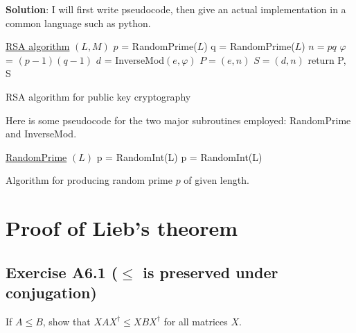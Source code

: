 \documentclass{book}
\begin{document}
    \textbf{Solution}: I will first write pseudocode, then give an actual implementation in a common language such as python.
    \begin{algorithm}
        
        \underline{RSA algorithm} $(L,M)$\;
        $p$ = RandomPrime($L$)\;
        q = RandomPrime($L$)\;
        $n = pq$\;
        $\varphi$ = $(p-1)(q-1)$\;
        $d$ = InverseMod$(e, \varphi)$\;
        $P = (e, n)$\;
        $S= (d,n)$\;
        return P, S
        \caption{RSA algorithm for public key cryptography}
    \end{algorithm}
    Here is some pseudocode for the two major subroutines employed: RandomPrime and InverseMod.
    \begin{algorithm}
        \underline{RandomPrime} $(L)$\;
        p = RandomInt(L)\;
            {
            p = RandomInt(L)\;
            }
        \caption{Algorithm for producing random prime $p$ of given length.}
    \end{algorithm}


\chapter{Proof of Lieb's theorem}


\section*{Exercise A6.1 ($\leq$ is preserved under conjugation)}
    If $A\leq B$, show that $XAX^\dagger \leq XBX^\dagger$ for all matrices $X$.
    
\end{document}
